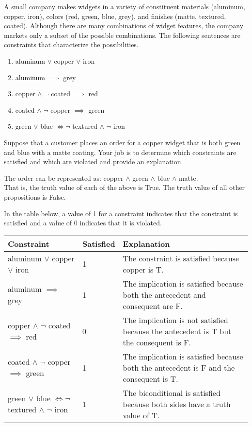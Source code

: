\documentclass[addpoints]{exam}
\begin{document}
\begin{questions}
\question[5] A small company makes widgets in a variety of constituent materials (aluminum, copper, iron), colors (red, green, blue, grey), and finishes (matte, textured, coated). Although there are many combinations of widget features, the company markets only a subset of the possible combinations. The following sentences are constraints that characterize the possibilities. 
  \begin{enumerate}
  \item aluminum $\lor$ copper $\lor$ iron
  \item aluminum $\implies$ grey
  \item copper $\land$ $\neg$ coated $\implies$ red
  \item coated $\land$ $\neg$ copper $\implies$ green
  \item green $\lor$ blue $\iff \neg$ textured $\land$ $\neg$ iron
  \end{enumerate}
  Suppose that a customer places an order for a copper widget that is both green and blue with a matte coating. Your job is to determine which constraints are satisfied and which are violated and provide an explanation.
  \begin{solution} %
    The order can be represented as: copper $\land$ green  $\land$ blue  $\land$ matte.\\
    That is, the truth value of each of the above is True. The truth value of all other propositions is False.
    
    In the table below, a value of 1 for a constraint indicates that the constraint is satisfied and a value of 0 indicates that it is violated.

    \begin{tabularx}{\textwidth}{l|l|X}
      Constraint & Satisfied & Explanation \\\hline\hline
      aluminum $\lor$ copper $\lor$ iron & 1 & The constraint is satisfied because copper is T.\\\hline
      aluminum $\implies$ grey & 1 & The implication is satisfied because both the antecedent and consequent are F. \\\hline
      copper $\land$ $\neg$ coated $\implies$ red & 0 & The implication is not satisfied because the antecedent is T but the consequent is F. \\\hline
      coated $\land$ $\neg$ copper $\implies$ green & 1 & The implication is satisfied because both the antecedent is F and the consequent is T. \\\hline
      green $\lor$ blue $\iff \neg$ textured $\land$ $\neg$ iron & 1 & The biconditional is satisfied because both sides have a truth value of T.
    \end{tabularx}
  \end{solution}
  

\end{questions}
\end{document}
